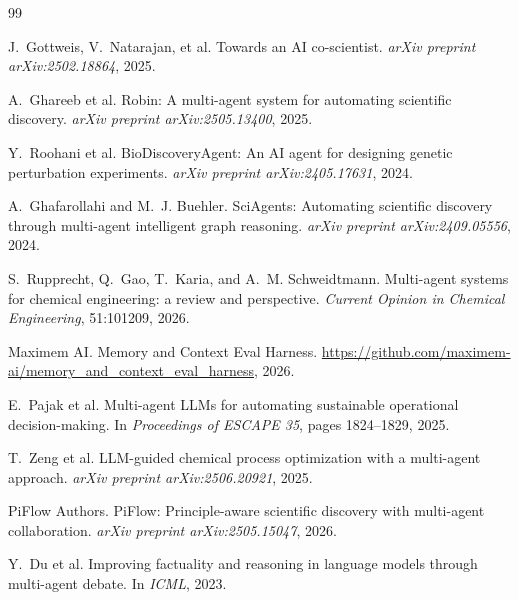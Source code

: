 \documentclass[11pt]{article}
\begin{document}

\begin{thebibliography}{99}
\small

J.~Gottweis, V.~Natarajan, et al.
\newblock Towards an AI co-scientist.
\newblock \emph{arXiv preprint arXiv:2502.18864}, 2025.

A.~Ghareeb et al.
\newblock Robin: A multi-agent system for automating scientific discovery.
\newblock \emph{arXiv preprint arXiv:2505.13400}, 2025.

Y.~Roohani et al.
\newblock BioDiscoveryAgent: An AI agent for designing genetic perturbation experiments.
\newblock \emph{arXiv preprint arXiv:2405.17631}, 2024.

A.~Ghafarollahi and M.~J. Buehler.
\newblock SciAgents: Automating scientific discovery through multi-agent intelligent graph reasoning.
\newblock \emph{arXiv preprint arXiv:2409.05556}, 2024.

S.~Rupprecht, Q.~Gao, T.~Karia, and A.~M. Schweidtmann.
\newblock Multi-agent systems for chemical engineering: a review and perspective.
\newblock \emph{Current Opinion in Chemical Engineering}, 51:101209, 2026.

Maximem AI.
\newblock Memory and Context Eval Harness.
\newblock \url{https://github.com/maximem-ai/memory_and_context_eval_harness}, 2026.

E.~Pajak et al.
\newblock Multi-agent LLMs for automating sustainable operational decision-making.
\newblock In \emph{Proceedings of ESCAPE 35}, pages 1824--1829, 2025.

T.~Zeng et al.
\newblock LLM-guided chemical process optimization with a multi-agent approach.
\newblock \emph{arXiv preprint arXiv:2506.20921}, 2025.

PiFlow Authors.
\newblock PiFlow: Principle-aware scientific discovery with multi-agent collaboration.
\newblock \emph{arXiv preprint arXiv:2505.15047}, 2026.

Y.~Du et al.
\newblock Improving factuality and reasoning in language models through multi-agent debate.
\newblock In \emph{ICML}, 2023.


\end{thebibliography}
\end{document}
